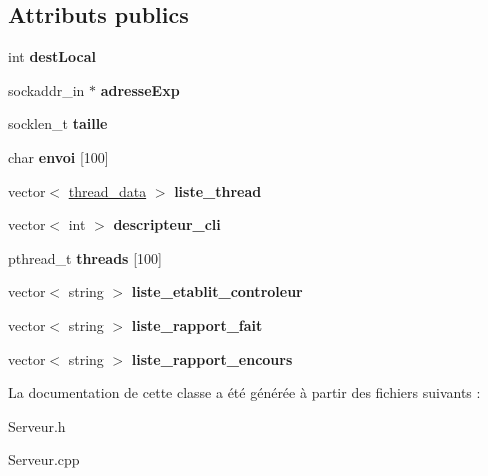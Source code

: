 \subsection*{Attributs publics}
\begin{DoxyCompactItemize}
\item 
\hypertarget{class_serveur_a606f8c26e8ddeba7bb84e8661525e37f}{int {\bfseries dest\-Local}}\label{class_serveur_a606f8c26e8ddeba7bb84e8661525e37f}

\item 
\hypertarget{class_serveur_a745aeefe5b63991eefffb6b1b79762f4}{sockaddr\-\_\-in $\ast$ {\bfseries adresse\-Exp}}\label{class_serveur_a745aeefe5b63991eefffb6b1b79762f4}

\item 
\hypertarget{class_serveur_a03c8b41efd2a24cceefe748f3986dc88}{socklen\-\_\-t {\bfseries taille}}\label{class_serveur_a03c8b41efd2a24cceefe748f3986dc88}

\item 
\hypertarget{class_serveur_a1abee959761a58815f7878483c635fa5}{char {\bfseries envoi} \mbox{[}100\mbox{]}}\label{class_serveur_a1abee959761a58815f7878483c635fa5}

\item 
\hypertarget{class_serveur_abc61f04a941acabe63665a6147321c04}{vector$<$ \hyperlink{struct_serveur_1_1thread__data}{thread\-\_\-data} $>$ {\bfseries liste\-\_\-thread}}\label{class_serveur_abc61f04a941acabe63665a6147321c04}

\item 
\hypertarget{class_serveur_a350976885f84b87f2c6533b4b327a867}{vector$<$ int $>$ {\bfseries descripteur\-\_\-cli}}\label{class_serveur_a350976885f84b87f2c6533b4b327a867}

\item 
\hypertarget{class_serveur_ab55a69165d516980da7587b35f67584a}{pthread\-\_\-t {\bfseries threads} \mbox{[}100\mbox{]}}\label{class_serveur_ab55a69165d516980da7587b35f67584a}

\item 
\hypertarget{class_serveur_a0b74dc824f0b93f9fd141723c46033d2}{vector$<$ string $>$ {\bfseries liste\-\_\-etablit\-\_\-controleur}}\label{class_serveur_a0b74dc824f0b93f9fd141723c46033d2}

\item 
\hypertarget{class_serveur_a7e782ca7679ec1a84dd79ac36a214df6}{vector$<$ string $>$ {\bfseries liste\-\_\-rapport\-\_\-fait}}\label{class_serveur_a7e782ca7679ec1a84dd79ac36a214df6}

\item 
\hypertarget{class_serveur_ac7776debc1b77647886d34bad7d39580}{vector$<$ string $>$ {\bfseries liste\-\_\-rapport\-\_\-encours}}\label{class_serveur_ac7776debc1b77647886d34bad7d39580}

\end{DoxyCompactItemize}


La documentation de cette classe a été générée à partir des fichiers suivants \-:\begin{DoxyCompactItemize}
\item 
Serveur.\-h\item 
Serveur.\-cpp\end{DoxyCompactItemize}
